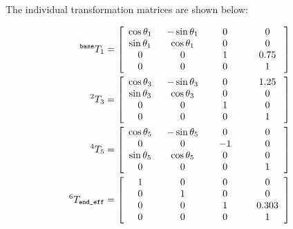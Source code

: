 \documentclass[a4paper]{article}
\newcommand\w[1]{\makebox[3.4em]{$#1$}}
\begin{document}
The individual transformation matrices are shown below:\\
\small
\begin{minipage}[t]{0.45\textwidth}
	\begin{align*}
	^\texttt{base} T_1 &=
	\begin{bmatrix}
	\cos \theta_1 	& -\sin \theta_1 	& 0 	& 0\\
	\sin \theta_1	& \cos \theta_1		& 0		& 0\\
	0				& 0					& 1		& 0.75\\
	\w0				& \w0				& \w0	& \w1\\
	\end{bmatrix}\\
	^2 T_3 &=
	\begin{bmatrix}
	\cos \theta_3 	& -\sin \theta_3 	& 0 	& 1.25\\
	\sin \theta_3	& \cos \theta_3		& 0		& 0\\
	0				& 0					& 1		& 0\\
	\w0				& \w0				& \w0	& \w1
	\end{bmatrix}\\
	^4 T_5 &=
	\begin{bmatrix}
	\cos \theta_5	& -\sin \theta_5	& 0		& 0\\
	0				& 0					& -1	& 0\\
	\sin \theta_5	& \cos \theta_5		& 0		& 0\\
	\w0				& \w0				& \w0	& \w1
	\end{bmatrix}\\
	^6 T_\texttt{end\_eff} &=
	\begin{bmatrix}
	1				& 0					& 0		& 0\\
	0				& 1					& 0		& 0\\
	0				& 0					& \w1		& 0.303\\
	\w0				& \w0				& 0		& \w1
	\end{bmatrix}
	\end{align*}
\end{minipage}
\hspace{0.2cm}
\end{document}
